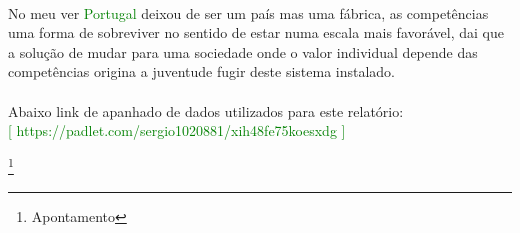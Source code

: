 \\
No meu ver \textcolor{green}{Portugal} deixou de ser um país mas uma fábrica, as competências uma forma de sobreviver no sentido de estar numa escala mais favorável, dai que a solução de mudar para uma sociedade onde o valor individual depende das competências origina a juventude fugir deste sistema instalado.\\
\\
Abaixo link de apanhado de dados utilizados para este relatório:\\ \textcolor{green}{\small [ https://padlet.com/sergio1020881/xih48fe75koesxdg ]}

\newpage
%
%
\listoffigures
\cite{*}

\newpage
\footnote{Apontamento}

